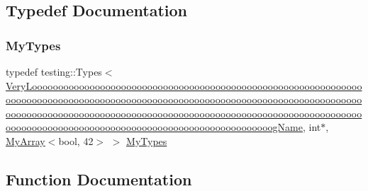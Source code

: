 \subsection{Typedef Documentation}
\mbox{\label{googletest-list-tests-unittest___8cc_a16f58cd49c18568802322bbaf9f3f654}} 
\subsubsection{\texorpdfstring{MyTypes}{MyTypes}}
{\footnotesize\ttfamily typedef testing\+::\+Types$<$\mbox{\hyperlink{classVeryLoooooooooooooooooooooooooooooooooooooooooooooooooooooooooooooooooooooooooooooooooooooo72732a7a8cd04f0ab9551a6aaa86a0c2}{Very\+Loooooooooooooooooooooooooooooooooooooooooooooooooooooooooooooooooooooooooooooooooooooooooooooooooooooooooooooooooooooooooooooooooooooooooooooooooooooooooooooooooooooooooooooooooooooooooooooooooooooooooooooooooooooooooooooooooooooooooooooooooooooooooog\+Name}}, int$\ast$, \mbox{\hyperlink{classMyArray}{My\+Array}}$<$bool, 42$>$ $>$ \mbox{\hyperlink{googletest-list-tests-unittest___8cc_a16f58cd49c18568802322bbaf9f3f654}{My\+Types}}}



\subsection{Function Documentation}
\mbox{\label{googletest-list-tests-unittest___8cc_aae3f9f4ba0f7ea179b0976679d0906c6}} 
